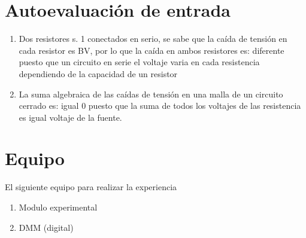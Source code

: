 \section{Autoevaluación de entrada}
\begin{enumerate}
	\item Dos resistores s. 1 conectados en serio, se sabe que la caída de tensión en cada
	resistor es BV, por lo que la caída en ambos resistores es: diferente puesto que un circuito en serie el voltaje varia en cada resistencia dependiendo de la capacidad de un resistor
	\item  La suma algebraica de las caídas de tensión en una malla de un circuito cerrado es: igual 0 puesto que la suma de todos los voltajes de las resistencia es igual voltaje de la fuente.
\end{enumerate}
\section{Equipo}
El siguiente equipo para realizar la experiencia 
\begin{enumerate}
	\item Modulo experimental 
	\item DMM (digital)
\end{enumerate}
